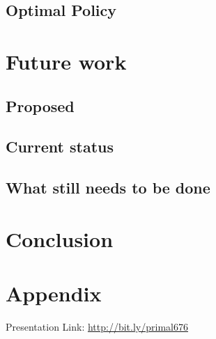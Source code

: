 \documentclass[a4paper, 11pt]{article} %
\begin{document}
\subsection{Optimal Policy}

\section{Future work}

\subsection{Proposed}

\subsection{Current status}

\subsection{What still needs to be done}

\section{Conclusion}

\section*{Appendix}

Presentation Link: \url{http://bit.ly/primal676}







\end{document}
